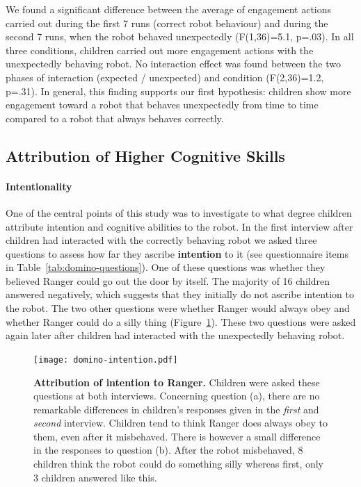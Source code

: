 \documentclass{sig-alternate}
\begin{document}
We found a significant difference between the average of engagement
actions carried out during the first 7 runs (correct robot behaviour) and during
the second 7 runs, when the robot behaved unexpectedly (F(1,36)=5.1, p=.03). In
all three conditions, children carried out more engagement actions with the
unexpectedly behaving robot. No interaction effect was found between the two
phases of interaction (expected / unexpected) and condition (F(2,36)=1.2,
p=.31). In general, this finding supports our first hypothesis: children show
more engagement toward a robot that behaves unexpectedly from time to time
compared to a robot that always behaves correctly.

\subsection{Attribution of Higher Cognitive Skills}

\paragraph{Intentionality}

One of the central points of this study was to investigate to what degree
children attribute intention and cognitive abilities to the robot.  In the first
interview after children had interacted with the correctly behaving robot we
asked three questions to assess how far they ascribe \textbf{intention} to it
(see questionnaire items in Table~\ref{tab:domino-questions}). One of these
questions was whether they believed Ranger could go out the door by itself. The
majority of 16 children answered negatively, which suggests that they initially
do not ascribe intention to the robot. The two other questions were whether
Ranger would always obey and whether Ranger could do a silly thing
(Figure~\ref{fig:domino-intention}). These two questions were asked again later
after children had interacted with the unexpectedly behaving robot.


\begin{figure}[h]
    \centering
    \texttt{[image: domino-intention.pdf]}
    \caption{\small \textbf{Attribution of intention to Ranger.} Children were
        asked these questions at both interviews. Concerning question (a), there
        are no remarkable differences in children's responses given in the
        \textit{first} and \textit{second} interview.  Children tend to think
        Ranger does always obey to them, even after it misbehaved. There is
        however a small difference in the responses to question (b).  After the
        robot misbehaved, 8 children think the robot could do something silly whereas
        first, only 3 children answered like this.}
    
    \label{fig:domino-intention}

\end{figure}
\end{document}
